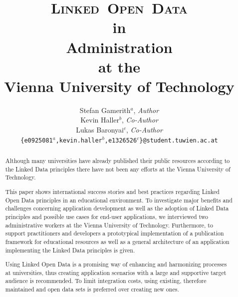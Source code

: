 \documentclass{article}
\begin{document}
\renewcommand{\bibname}{References}

\pagestyle{plain}

\title{\textsc{\textbf{L}inked~\textbf{O}pen~\textbf{D}ata}\\in\\Administration\\at the\\Vienna University of Technology}
\date{}
\author{Stefan Gamerith$^a$, \textit{Author}\\
Kevin Haller$^b$, \textit{Co-Author}\\
Lukas Baronyai$^c$, \textit{Co-Author}\\
\texttt{\{e0925081$^a$,kevin.haller$^b$,e1326526$^c$\}@student.tuwien.ac.at}}

\maketitle
\thispagestyle{empty}

\begin{abstract}
Although many universities have already published their public resources according to the Linked Data principles there 
have not been any efforts at the Vienna University of Technology.

This paper shows international success stories and best practices 
regarding Linked Open Data principles in an educational environment. To investigate major benefits and challenges concerning application 
development as well as the adoption of Linked Data principles and possible use cases for end-user applications, we interviewed two 
administrative workers at the Vienna University of Technology. Furthermore, to support practitioners and developers a prototypical 
implementation of a publication framework for educational resources as well as a general architecture of an application implementing the Linked Data principles
is given. 

Using Linked Open Data is a promising way of enhancing and harmonizing processes at universities, thus creating application scenarios with a large and supportive target audience is recommended. To limit integration costs, using existing, therefore maintained and open data sets is preferred over creating new ones. 


\end{abstract}

\newpage
\tableofcontents
\thispagestyle{empty}

\newpage
{}
\end{document}
